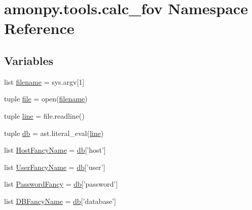 \hypertarget{namespaceamonpy_1_1tools_1_1calc__fov}{\section{amonpy.\-tools.\-calc\-\_\-fov Namespace Reference}
\label{namespaceamonpy_1_1tools_1_1calc__fov}
}
\subsection*{Variables}
\begin{DoxyCompactItemize}
\item 
list \hyperlink{namespaceamonpy_1_1tools_1_1calc__fov_affa2b5e823ee36cb35cd6ff636ea9779}{filename} = sys.\-argv\mbox{[}1\mbox{]}
\item 
tuple \hyperlink{namespaceamonpy_1_1tools_1_1calc__fov_a15d9d06da5b6c8cfcf67268b8dac0a9e}{file} = open(\hyperlink{namespaceamonpy_1_1tools_1_1calc__fov_affa2b5e823ee36cb35cd6ff636ea9779}{filename})
\item 
tuple \hyperlink{namespaceamonpy_1_1tools_1_1calc__fov_abd58f153114f0c0bbde7d57f8fa6355b}{line} = file.\-readline()
\item 
tuple \hyperlink{namespaceamonpy_1_1tools_1_1calc__fov_af18ce88a52b6ecd5b14ebc9efcde7cd1}{db} = ast.\-literal\-\_\-eval(\hyperlink{namespaceamonpy_1_1tools_1_1calc__fov_abd58f153114f0c0bbde7d57f8fa6355b}{line})
\item 
list \hyperlink{namespaceamonpy_1_1tools_1_1calc__fov_a08d7bd374fdd9e63ae99ef1bfb9e491e}{Host\-Fancy\-Name} = \hyperlink{namespaceamonpy_1_1tools_1_1calc__fov_af18ce88a52b6ecd5b14ebc9efcde7cd1}{db}\mbox{[}'host'\mbox{]}
\item 
list \hyperlink{namespaceamonpy_1_1tools_1_1calc__fov_ad6d8c3b48b201711ced879a1deb01343}{User\-Fancy\-Name} = \hyperlink{namespaceamonpy_1_1tools_1_1calc__fov_af18ce88a52b6ecd5b14ebc9efcde7cd1}{db}\mbox{[}'user'\mbox{]}
\item 
list \hyperlink{namespaceamonpy_1_1tools_1_1calc__fov_afc1cd72f7d87836af535f28839548514}{Password\-Fancy} = \hyperlink{namespaceamonpy_1_1tools_1_1calc__fov_af18ce88a52b6ecd5b14ebc9efcde7cd1}{db}\mbox{[}'password'\mbox{]}
\item 
list \hyperlink{namespaceamonpy_1_1tools_1_1calc__fov_aaea6d1eb2555bb480ec49524534e7d7d}{D\-B\-Fancy\-Name} = \hyperlink{namespaceamonpy_1_1tools_1_1calc__fov_af18ce88a52b6ecd5b14ebc9efcde7cd1}{db}\mbox{[}'database'\mbox{]}
\item 

\end{DoxyCompactItemize}
